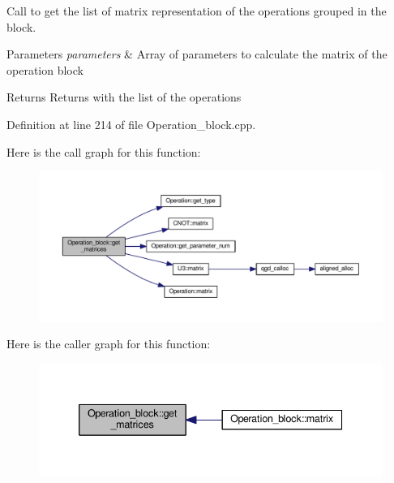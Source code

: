 Call to get the list of matrix representation of the operations grouped in the block. 


\begin{DoxyParams}{Parameters}
{\em parameters} & Array of parameters to calculate the matrix of the operation block \\
\hline
\end{DoxyParams}
\begin{DoxyReturn}{Returns}
Returns with the list of the operations 
\end{DoxyReturn}


Definition at line 214 of file Operation\+\_\+block.\+cpp.



Here is the call graph for this function\+:
\nopagebreak
\begin{figure}[H]
\begin{center}
\leavevmode
\includegraphics[width=350pt]{class_operation__block_aedddbc5242eab7c00125359a835ac53d_cgraph}
\end{center}
\end{figure}




Here is the caller graph for this function\+:
\nopagebreak
\begin{figure}[H]
\begin{center}
\leavevmode
\includegraphics[width=339pt]{class_operation__block_aedddbc5242eab7c00125359a835ac53d_icgraph}
\end{center}
\end{figure}



